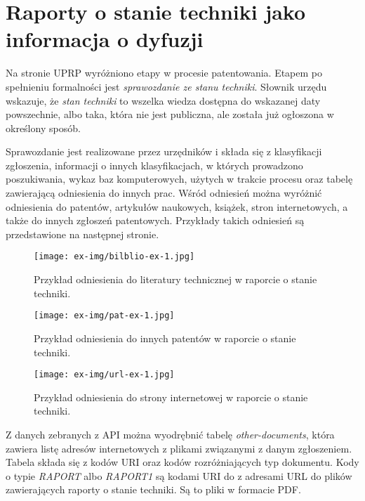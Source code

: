 \section{Raporty o stanie techniki jako informacja o dyfuzji}

Na stronie \ac{UPRP} wyróżniono etapy w procesie patentowania.
Etapem po spełnieniu formalności jest 
\textit{sprawozdanie ze stanu techniki}\cite{UPRP-pat-prd}.
Słownik urzędu wskazuje, że \textit{stan techniki} to wszelka
wiedza dostępna do wskazanej daty powszechnie, albo taka,
która nie jest publiczna, ale została już ogłoszona 
w określony sposób\cite{UPRP-dict}.

Sprawozdanie jest realizowane przez urzędników i składa się z
klasyfikacji zgłoszenia, informacji o innych klasyfikacjach,
w których prowadzono poszukiwania, wykaz baz komputerowych,
użytych w trakcie procesu oraz tabelę zawierającą odniesienia
do innych prac. Wśród odniesień można wyróżnić odniesienia do
patentów, artykułów naukowych, książek, stron internetowych,
a także do innych zgłoszeń patentowych.
Przykłady takich odniesień są przedstawione na następnej stronie.

\newpage
\begin{figure}[H]\centering
\label{fig:raport-biblio-ex}
\texttt{[image: ex-img/bilblio-ex-1.jpg]}
\caption{Przykład odniesienia do literatury technicznej 
         w raporcie o stanie techniki.}
\end{figure}
\begin{figure}[H]\centering
\label{fig:raport-pat-ex}
\texttt{[image: ex-img/pat-ex-1.jpg]}
\caption{Przykład odniesienia do innych patentów 
         w raporcie o stanie techniki.}
\end{figure}
\begin{figure}[H]\centering
\label{fig:raport-url-ex}
\texttt{[image: ex-img/url-ex-1.jpg]}
\caption{Przykład odniesienia do strony internetowej 
         w raporcie o stanie techniki.}
\end{figure}
\newpage

Z danych zebranych z \ac{API} można wyodrębnić tabelę 
\textit{other-documents}, która zawiera listę adresów internetowych
z plikami związanymi z danym zgłoszeniem. Tabela składa się
z kodów \ac{URI} oraz kodów rozróżniających typ dokumentu.
Kody o typie \textit{RAPORT} albo \textit{RAPORT1} są kodami 
\ac{URI} do z adresami \ac{URL} do plików zawierających raporty 
o stanie techniki. Są to pliki w formacie \ac{PDF}.

